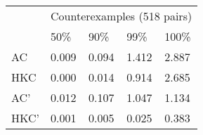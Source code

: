 \begin{tabular}{l|llll}
\multirow{2}{*}{} & \multicolumn{4}{c}{Counterexamples (518 pairs)} \\ \cline{2-5}
                  & 50\%       & 90\%       & 99\%      & 100\%     \\ \hline
AC                & 0.009      & 0.094      & 1.412     & 2.887     \\
HKC               & 0.000      & 0.014      & 0.914     & 2.685     \\
AC'               & 0.012      & 0.107      & 1.047     & 1.134     \\
HKC'              & 0.001      & 0.005      & 0.025     & 0.383
\end{tabular}
